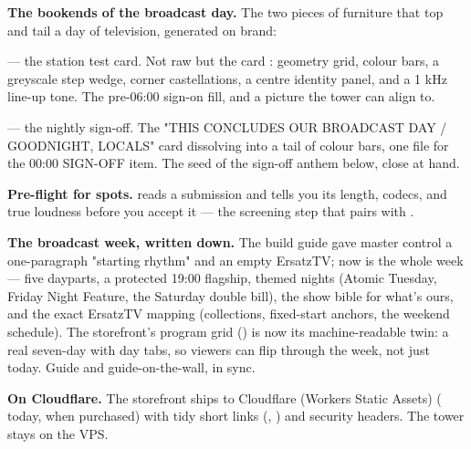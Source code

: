 \documentclass[fontpath=fonts/,logopath=logo/]{riposte-doc}
\begin{document}
\begin{ripbullets}
\item \textbf{The bookends of the broadcast day.} The two pieces of furniture that top and tail a day of television, generated on brand:
\begin{ripbullets}
\item {} — the station test card. Not raw  but the card : geometry grid, colour bars, a greyscale step wedge, corner castellations, a centre identity panel, and a 1 kHz line-up tone. The pre-06:00 sign-on fill, and a picture the tower can align to.
\item {} — the nightly sign-off. The "THIS CONCLUDES OUR BROADCAST DAY / GOODNIGHT, LOCALS" card dissolving into a tail of colour bars, one file for the 00:00 SIGN-OFF item. The seed of the sign-off anthem below, close at hand.
\end{ripbullets}

\item \textbf{Pre-flight for spots.}  reads a submission and tells you its length, codecs, and true loudness before you accept it — the screening step that pairs with .
\item \textbf{The broadcast week, written down.} The build guide gave master control a one-paragraph "starting rhythm" and an empty ErsatzTV; now  is the whole week — five dayparts, a protected 19:00 flagship, themed nights (Atomic Tuesday, Friday Night Feature, the Saturday double bill), the show bible for what's ours, and the exact ErsatzTV mapping (collections, fixed-start anchors, the weekend schedule). The storefront's program grid () is now its machine-readable twin: a real seven-day  with day tabs, so viewers can flip through the week, not just today. Guide and guide-on-the-wall, in sync.
\item \textbf{On Cloudflare.} The storefront ships to Cloudflare (Workers Static Assets) ( today,  when purchased) with tidy short links (, ) and security headers. The tower stays on the VPS.
\end{ripbullets}
\end{document}
